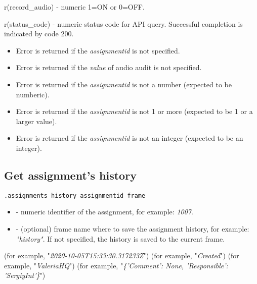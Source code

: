 \savedres
\begin{compactitem}
    \item r(record\_audio) - numeric 1=ON or 0=OFF.
    \item r(status\_code)  - numeric status code for API query. Successful completion is indicated by code 200.
\end{compactitem}

\errheader
\begin{itemize}
    \item Error  is returned if the \textit{assignmentid} is not specified.
    \item Error  is returned if the \textit{value} of audio audit is not specified.
    \item Error  is returned if the \textit{assignmentid} is not a number (expected to be numberic).
    \item Error  is returned if the \textit{assignmentid} is not 1 or more (expected to be 1 or a larger value).
    \item Error  is returned if the \textit{assignmentid} is not an integer (expected to be an integer).
\end{itemize}

\subsection{Get assignment's history}

\begin{lstlisting}[style=CommandLineStyle]
.assignments_history assignmentid frame
\end{lstlisting}

\paramsheader
\begin{itemize}
    \item {} - numeric identifier of the assignment, for example: \textit{1007}.
    \item {} - (optional) frame name where to save the assignment history, for example: \textit{"history"}. If not specified, the history is saved to the current frame.

\end{itemize}


\begin{compactitem}
     (for example, "\textit{2020-10-05T15:33:30.317233Z}")
     (for example, "\textit{Created}")
     (for example, "\textit{ValeriaHQ}")
     (for example, "\textit{\{'Comment': None, 'Responsible': 'SergiyInt'\}}")
\end{compactitem}

